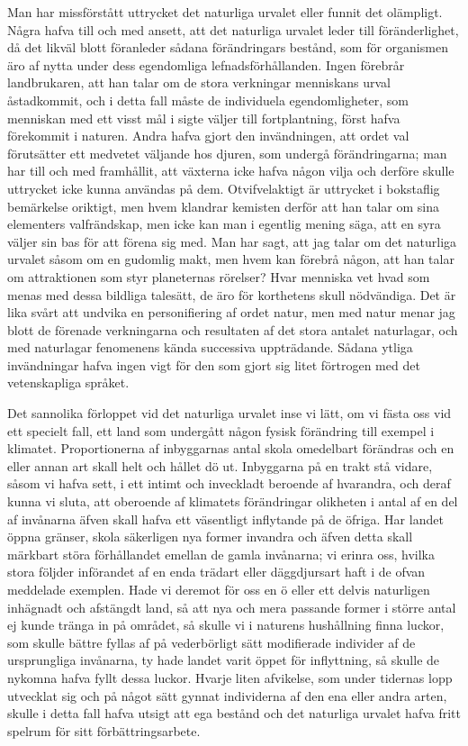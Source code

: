 Man har missförstått uttrycket det naturliga urvalet eller funnit det olämpligt. Några hafva till och med ansett, att det naturliga urvalet leder till föränderlighet, då det likväl blott föranleder sådana förändringars bestånd, som för organismen äro af nytta under dess egendomliga lefnadsförhållanden. Ingen förebrår landbrukaren, att han talar om de stora verkningar menniskans urval åstadkommit, och i detta fall måste de individuela egendomligheter, som menniskan med ett visst mål i sigte väljer till fortplantning, först hafva förekommit i naturen. Andra hafva gjort den invändningen, att ordet val förutsätter ett medvetet väljande hos djuren, som undergå förändringarna; man har till och med framhållit, att växterna icke hafva någon vilja och derföre skulle uttrycket icke kunna användas på dem. Otvifvelaktigt är uttrycket i bokstaflig bemärkelse oriktigt, men hvem klandrar kemisten derför att han talar om sina elementers valfrändskap, men icke kan man i egentlig mening säga, att en syra väljer sin bas för att förena sig med. Man har sagt, att jag talar om det naturliga urvalet såsom om en gudomlig makt, men hvem kan förebrå någon, att han talar om attraktionen som styr planeternas rörelser? Hvar menniska vet hvad som menas med dessa bildliga talesätt, de äro för korthetens skull nödvändiga. Det är lika svårt att undvika en personifiering af ordet natur, men med natur menar jag blott de förenade verkningarna och resultaten af det stora antalet naturlagar, och med naturlagar fenomenens kända successiva uppträdande. Sådana ytliga invändningar hafva ingen vigt för den som gjort sig litet förtrogen med det vetenskapliga språket.

Det sannolika förloppet vid det naturliga urvalet inse vi lätt, om vi fästa oss vid ett specielt fall, ett land som undergått någon fysisk förändring till exempel i klimatet. Proportionerna af inbyggarnas antal skola omedelbart förändras och en eller annan art skall helt och hållet dö ut. Inbyggarna på en trakt stå vidare, såsom vi hafva sett, i ett intimt och inveckladt beroende af hvarandra, och deraf kunna vi sluta, att oberoende af klimatets förändringar olikheten i antal af en del af invånarna äfven skall hafva ett väsentligt inflytande på de öfriga. Har landet öppna gränser, skola säkerligen nya former invandra och äfven detta skall märkbart störa förhållandet emellan de gamla invånarna; vi erinra oss, hvilka stora följder införandet af en enda trädart eller däggdjursart haft i de ofvan meddelade exemplen. Hade vi deremot för oss en ö eller ett delvis naturligen inhägnadt och afstängdt land, så att nya och mera passande former i större antal ej kunde tränga in på området, så skulle vi i naturens hushållning finna luckor, som skulle bättre fyllas af på vederbörligt sätt modifierade individer af de ursprungliga invånarna, ty hade landet varit öppet för inflyttning, så skulle de nykomna hafva fyllt dessa luckor. Hvarje liten afvikelse, som under tidernas lopp utvecklat sig och på något sätt gynnat individerna af den ena eller andra arten, skulle i detta fall hafva utsigt att ega bestånd och det naturliga urvalet hafva fritt spelrum för sitt förbättringsarbete.

